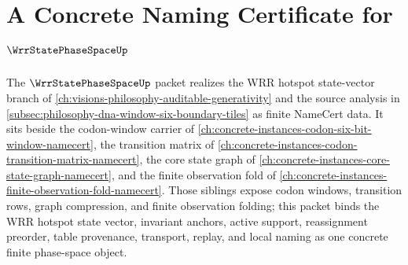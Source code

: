 \chapter{A Concrete Naming Certificate for $\WrrStatePhaseSpaceUp$}
\label{ch:concrete-instances-wrr-state-phase-space-namecert}

The $\WrrStatePhaseSpaceUp$ packet realizes the WRR hotspot state-vector branch of \autoref{ch:visions-philosophy-auditable-generativity} and the source analysis in \autoref{subsec:philosophy-dna-window-six-boundary-tiles} as finite NameCert data. It sits beside the codon-window carrier of \autoref{ch:concrete-instances-codon-six-bit-window-namecert}, the transition matrix of \autoref{ch:concrete-instances-codon-transition-matrix-namecert}, the core state graph of \autoref{ch:concrete-instances-core-state-graph-namecert}, and the finite observation fold of \autoref{ch:concrete-instances-finite-observation-fold-namecert}. Those siblings expose codon windows, transition rows, graph compression, and finite observation folding; this packet binds the WRR hotspot state vector, invariant anchors, active support, reassignment preorder, table provenance, transport, replay, and local naming as one concrete finite phase-space object.

